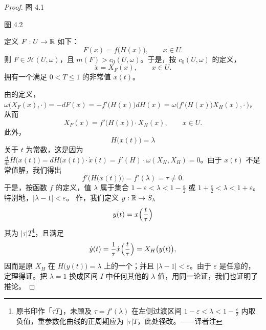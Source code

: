 \begin{proof}
\begin{minipage}{\linewidth}
图 4.1
\end{minipage}

\noindent\begin{minipage}{\linewidth}
\centering
{}

图 4.2
\end{minipage}

定义 $F:U\to\mathbb{R}$ 如下：
\[
F(x)=f\bigl(H(x)\bigr),\qquad x\in U.
\]
则 $F\in\mathcal{H}(U,\omega)$，且 $m(F)>c_{0}(U,\omega)$。于是，按\trCapacity{}%
$c_{0}(U,\omega)$ 的定义，\trHamiltonianSystem
\[
\dot{x}=X_{F}(x),\qquad x\in U.
\]
拥有一个\trPeriodic{}满足 $0<T\leq1$ 的非常值\trPeriodicSolution{} $x(t)$。

由\trHamiltonianVectorField{}的定义，%
$\omega\bigl(X_{F}(x),\cdot\,\bigr)=-dF(x)=-f'\bigl(H(x)\bigr)dH(x)=%
\omega\bigl(f'\bigl(H(x)\bigr)X_{H}(x),\cdot\,\bigr)$，从而
\[
X_{F}(x)=f'\bigl(H(x)\bigr)\cdot X_{H}(x),\qquad x\in U.
\]
此外，
\[
H\bigl(x(t)\bigr)=\lambda
\]
关于 $t$ 为常数，这是因为%
$\frac{d}{dt}H\bigl(x(t)\bigr)=dH\bigl(x(t)\bigr)\cdot\dot{x}(t)=%
f'(H)\cdot\omega(X_{H},X_{H})=0$。由于 $x(t)$ 不是常值解，我们得出
\[
f'\bigl(H\bigl(x(t)\bigr)\bigr)=f'(\lambda)=\tau\neq0.
\]
于是，按函数 $f$ 的定义，值 $\lambda$ 属于集合%
$1-\varepsilon<\lambda<1-\tfrac{\varepsilon}{2}$ 或%
$1+\tfrac{\varepsilon}{2}<\lambda<1+\varepsilon$。特别地，$|\lambda-1|<\varepsilon$。%
作\trReparametrization，我们定义\trClosed\trCurve{} $y:\mathbb{R}\to S_{\lambda}$
\[
y(t)=x\Bigl(\frac{t}{\tau}\Bigr)
\]
其\trPeriodic{}为 $|\tau|T$\footnote{原书印作「$\tau T$」，未顾及 $\tau=f'(\lambda)$ 在左侧过渡区间 $1-\varepsilon<\lambda<1-\tfrac{\varepsilon}{2}$ 内取负值，重参数化曲线的正周期应为 $|\tau|T$，此处径改。——译者注}，且满足
\[
\dot{y}(t)=\frac{1}{\tau}\dot{x}\Bigl(\frac{t}{\tau}\Bigr)=X_{H}\bigl(y(t)\bigr),
\]
因而是原\trHamiltonianVectorField{} $X_{H}$ 在\trEnergySurface{}%
$H\bigl(y(t)\bigr)=\lambda$ 上的一个\trPeriodicSolution；并且%
$|\lambda-1|<\varepsilon$。由于 $\varepsilon$ 是任意的，定理得证。把 $\lambda=1$%
换成区间 $I$ 中任何其他的 $\lambda$ 值，用同一论证，我们也证明了推论。
\end{proof}

